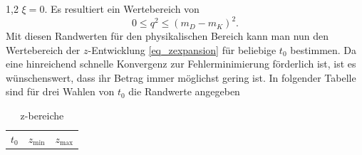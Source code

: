 \documentclass[11pt,a4paper,twoside]{report}
\begin{document}
\begin{spacing}{1,2}
$\xi = 0$. Es resultiert ein Wertebereich von
\begin{equation}
 0 \leq q^2 \leq (m_D - m_K)^2.
\end{equation}
Mit diesen Randwerten für den physikalischen Bereich kann man nun den Wertebereich der $z$-Entwicklung \eqref{eq_zexpansion} für beliebige $t_0$ bestimmen.
Da eine hinreichend schnelle Konvergenz zur Fehlerminimierung förderlich ist, ist es wünschenswert, dass ihr Betrag immer möglichst gering ist. In 
folgender Tabelle sind für drei Wahlen von $t_0$ die Randwerte angegeben
\begin{table}[h]
 \begin{tabular}{c|cc}
  $t_0$ & $z_\text{min}$ & $z_\text{max}$\\
 \end{tabular}
\caption{z-bereiche}
\label{tab_zbereich}
\end{table}



\end{spacing}
\end{document}
